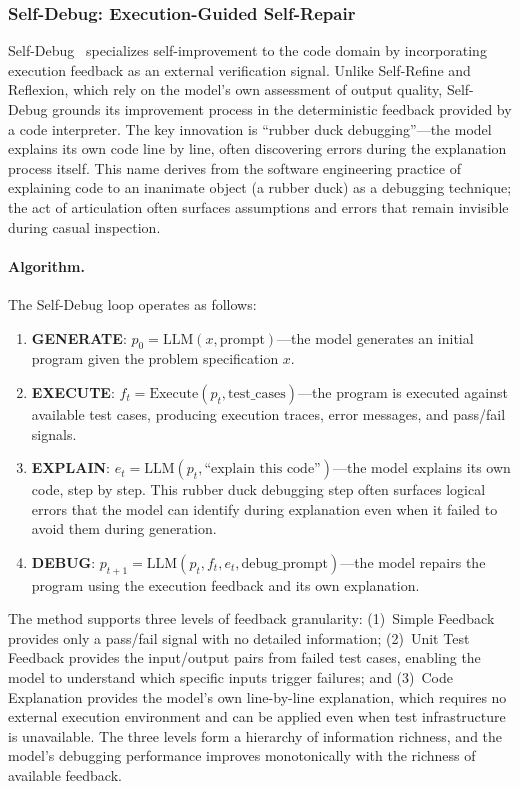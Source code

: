 \subsubsection{Self-Debug: Execution-Guided Self-Repair}
\label{sec:self-debug}

Self-Debug~\citep{chen2024selfdebug} specializes self-improvement to the code domain by incorporating execution feedback as an external verification signal. Unlike Self-Refine and Reflexion, which rely on the model's own assessment of output quality, Self-Debug grounds its improvement process in the deterministic feedback provided by a code interpreter. The key innovation is ``rubber duck debugging''---the model explains its own code line by line, often discovering errors during the explanation process itself. This name derives from the software engineering practice of explaining code to an inanimate object (a rubber duck) as a debugging technique; the act of articulation often surfaces assumptions and errors that remain invisible during casual inspection.

\paragraph{Algorithm.}
The Self-Debug loop operates as follows:

\begin{enumerate}
    \item \textbf{GENERATE}: $p_0 = \mathrm{LLM}(x, \text{prompt})$---the model generates an initial program given the problem specification $x$.
    \item \textbf{EXECUTE}: $f_t = \mathrm{Execute}(p_t, \text{test\_cases})$---the program is executed against available test cases, producing execution traces, error messages, and pass/fail signals.
    \item \textbf{EXPLAIN}: $e_t = \mathrm{LLM}(p_t, \text{``explain this code''})$---the model explains its own code, step by step. This rubber duck debugging step often surfaces logical errors that the model can identify during explanation even when it failed to avoid them during generation.
    \item \textbf{DEBUG}: $p_{t+1} = \mathrm{LLM}(p_t, f_t, e_t, \text{debug\_prompt})$---the model repairs the program using the execution feedback and its own explanation.
\end{enumerate}

The method supports three levels of feedback granularity: (1)~Simple Feedback provides only a pass/fail signal with no detailed information; (2)~Unit Test Feedback provides the input/output pairs from failed test cases, enabling the model to understand which specific inputs trigger failures; and (3)~Code Explanation provides the model's own line-by-line explanation, which requires no external execution environment and can be applied even when test infrastructure is unavailable. The three levels form a hierarchy of information richness, and the model's debugging performance improves monotonically with the richness of available feedback.

